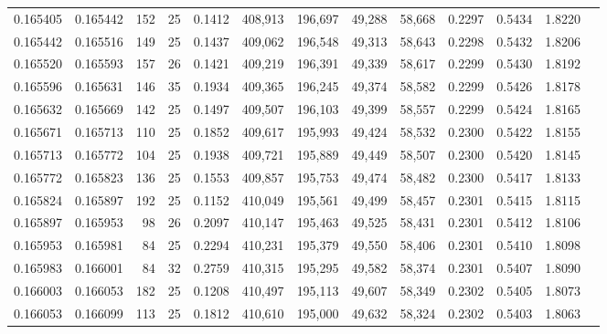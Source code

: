 \begin{tabular}{rrrrrrrrrrrrr}
0.165405 & 0.165442 & 152 &  25 &                                     0.1412 & 408,913 & 196,697 &  49,288 &  58,668 & 0.2297 & 0.5434 & 1.8220 \\
0.165442 & 0.165516 & 149 &  25 &                                     0.1437 & 409,062 & 196,548 &  49,313 &  58,643 & 0.2298 & 0.5432 & 1.8206 \\
0.165520 & 0.165593 & 157 &  26 &                                     0.1421 & 409,219 & 196,391 &  49,339 &  58,617 & 0.2299 & 0.5430 & 1.8192 \\
0.165596 & 0.165631 & 146 &  35 &                                     0.1934 & 409,365 & 196,245 &  49,374 &  58,582 & 0.2299 & 0.5426 & 1.8178 \\
0.165632 & 0.165669 & 142 &  25 &                                     0.1497 & 409,507 & 196,103 &  49,399 &  58,557 & 0.2299 & 0.5424 & 1.8165 \\
0.165671 & 0.165713 & 110 &  25 &                                     0.1852 & 409,617 & 195,993 &  49,424 &  58,532 & 0.2300 & 0.5422 & 1.8155 \\
0.165713 & 0.165772 & 104 &  25 &                                     0.1938 & 409,721 & 195,889 &  49,449 &  58,507 & 0.2300 & 0.5420 & 1.8145 \\
0.165772 & 0.165823 & 136 &  25 &                                     0.1553 & 409,857 & 195,753 &  49,474 &  58,482 & 0.2300 & 0.5417 & 1.8133 \\
0.165824 & 0.165897 & 192 &  25 &                                     0.1152 & 410,049 & 195,561 &  49,499 &  58,457 & 0.2301 & 0.5415 & 1.8115 \\
0.165897 & 0.165953 &  98 &  26 &                                     0.2097 & 410,147 & 195,463 &  49,525 &  58,431 & 0.2301 & 0.5412 & 1.8106 \\
0.165953 & 0.165981 &  84 &  25 &                                     0.2294 & 410,231 & 195,379 &  49,550 &  58,406 & 0.2301 & 0.5410 & 1.8098 \\
0.165983 & 0.166001 &  84 &  32 &                                     0.2759 & 410,315 & 195,295 &  49,582 &  58,374 & 0.2301 & 0.5407 & 1.8090 \\
0.166003 & 0.166053 & 182 &  25 &                                     0.1208 & 410,497 & 195,113 &  49,607 &  58,349 & 0.2302 & 0.5405 & 1.8073 \\
0.166053 & 0.166099 & 113 &  25 &                                     0.1812 & 410,610 & 195,000 &  49,632 &  58,324 & 0.2302 & 0.5403 & 1.8063 \\

\end{tabular}
